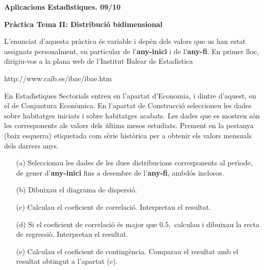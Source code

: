 \documentclass[11pt]{article}
\begin{document}
\begin{center}
\textbf{{\large{Aplicacions Estad\'{\i}stiques.  09/10}}}

\vspace{0.5cm}

\textbf{Pr\`actica Tema II: Distribuci\'o bidimensional}
\end{center} 

L'enunciat d'aquesta pr\`actica \'es variable i dep\`en dels valors que us han estat assignats personalment, en particular de l'\textbf{any-inici} i de l'\textbf{any-fi}. En primer lloc, dirigiu-vos a la plana web de l'Institut Balear de Estad\'{\i}stica 
\begin{center}
http://www.caib.es/ibae/ibae.htm
\end{center}
En Estad\'{\i}stiques Sectorials entreu en l'apartat d'Economia, i dintre d'aquest, en el de Conjuntura Econ\`omica. En l'apartat de Construcci\'o seleccioneu les dades sobre habitatges iniciats i sobre habitatges acabats. Les dades que es mostren s\'on les corresponents als valors dels \'ultims mesos estudiats. Prement en la pestanya (baix esquerra) etiquetada com s\`erie hist\`orica per a obtenir els valors mensuals dels darrers anys.

\begin{itemize}
\item [(a)] Seleccionau les dades de les dues distribucions corresponents al per\'{\i}ode, de gener d'\textbf{any-inici} fins a desembre de l'\textbf{any-fi}, ambd\'os inclosos.
\item [(b)] Dibuixau el diagrama de dispersi\'o.
\item [(c)] Calculau el coeficient de correlaci\'o. Interpretau el resultat.
\item [(d)] Si el coeficient de correlaci\'o \'es major que $0.5,$ calculau i dibuixau la recta de regressi\`o. Interpretau el resultat.
\item [(e)] Calculau el coeficient de conting\`encia. Comparau el resultat amb el resultat obtingut a l'apartat (c).
\end{itemize}
\end{document}
